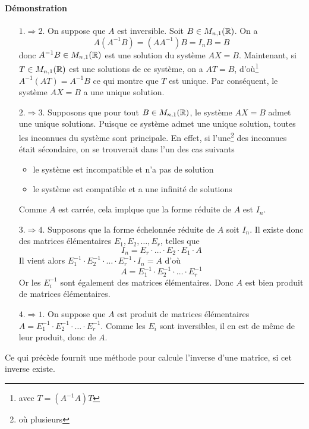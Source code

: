 \paragraph{Démonstration}
\begin{itemize}
  \item[$1. \Rightarrow 2.$] On suppose que $A$ est inversible. Soit $B \in M_{n, 1}(\mathbb{R})$. On a
    $$A (A^{-1} B) = (A A^{-1}) B = I_n B = B$$
    donc $A^{-1} B \in M_{n, 1}(\mathbb{R})$ est une solution du système $A X = B$. Maintenant, si $T \in M_{n, 1}(\mathbb{R})$ est une solutions de ce système, on a $A T = B$, d'où\footnote{avec $T = (A^{-1} A) T$} $A^{-1}(A T) = A^{-1} B$ ce qui montre que $T$ est unique. Par conséquent, le système $A X = B$ a une unique solution.
    
  \item[$2. \Rightarrow 3.$] Supposons que pour tout $B \in M_{n, 1}(\mathbb{R})$, le système $A X = B$ admet une unique solutions. Puisque ce système admet une unique solution, toutes les inconnues du système sont principale. En effet, si l'une\footnote{où plusieurs} des inconnues était sécondaire, on se trouverait dans l'un des cas suivants
    \begin{itemize}
      \item le système est incompatible et n'a pas de solution
      \item le système est compatible et a une infinité de solutions
    \end{itemize}
    Comme $A$ est carrée, cela implque que la forme réduite de $A$ est $I_n$.
    
  \item[$3. \Rightarrow 4.$] Supposons que la forme échelonnée réduite de $A$ soit $I_n$. Il existe donc des matrices élémentaires $E_1, E_2, \ldots , E_r$, telles que
    $$I_n = E_r \cdot \ldots \cdot E_2 \cdot E_1 \cdot A$$
    Il vient alors $E_1^{-1} \cdot E_2^{-1} \cdot \ldots \cdot E_r^{-1} \cdot I_n = A$ d'où
    $$A = E_1^{-1} \cdot E_2^{-1} \cdot \ldots \cdot E_r^{-1}$$
    Or les $E_i^{-1}$ sont également des matrices élémentaires. Donc $A$ est bien produit de matrices élémentaires.
    
  \item[$4. \Rightarrow 1.$] On suppose que $A$ est produit de matrices élémentaires $A = E_1^{-1} \cdot E_2^{-1} \cdot \ldots \cdot E_r^{-1}$. Comme les $E_i$ sont inversibles, il en est de même de leur produit, donc de $A$.
\end{itemize}
Ce qui précède fournit une méthode pour calcule l'inverse d'une matrice, si cet inverse existe.

